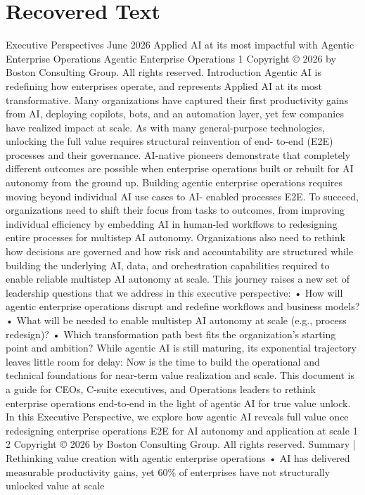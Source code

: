 \section{Recovered Text}
Executive
Perspectives
June 2026
Applied AI at its most impactful
with Agentic Enterprise Operations
Agentic Enterprise Operations
1
Copyright © 2026 by Boston Consulting Group. All rights reserved.
Introduction
Agentic AI is redefining how enterprises operate, and represents Applied AI at its most
transformative. Many organizations have captured their first productivity gains from AI, deploying
copilots, bots, and an automation layer, yet few companies have realized impact at scale. As with
many general-purpose technologies, unlocking the full value requires structural reinvention of end-
to-end (E2E) processes and their governance. AI-native pioneers demonstrate that completely
different outcomes are possible when enterprise operations built or rebuilt for AI autonomy from
the ground up.
Building agentic enterprise operations requires moving beyond individual AI use cases to AI-
enabled processes E2E. To succeed, organizations need to shift their focus from tasks to outcomes,
from improving individual efficiency by embedding AI in human-led workflows to redesigning
entire processes for multistep AI autonomy. Organizations also need to rethink how decisions are
governed and how risk and accountability are structured while building the underlying AI, data, and
orchestration capabilities required to enable reliable multistep AI autonomy at scale.
This journey raises a new set of leadership questions that we address in this executive perspective:
• How will agentic enterprise operations disrupt and redefine workflows and business models?
• What will be needed to enable multistep AI autonomy at scale (e.g., process redesign)?
• Which transformation path best fits the organization’s starting point and ambition?
While agentic AI is still maturing, its exponential trajectory leaves little room for delay: Now is the
time to build the operational and technical foundations for near-term value realization and scale.
This document is a guide for CEOs, C-suite executives, and Operations leaders to rethink
enterprise operations end-to-end in the light of agentic AI for true value unlock.
In this Executive
Perspective, we
explore how agentic
AI reveals full value
once redesigning
enterprise
operations E2E
for AI autonomy and
application at scale
1
2
Copyright © 2026 by Boston Consulting Group. All rights reserved.
Summary | Rethinking value creation with agentic enterprise operations
• AI has delivered measurable productivity gains, yet 60\% of enterprises have not structurally unlocked value at scale
